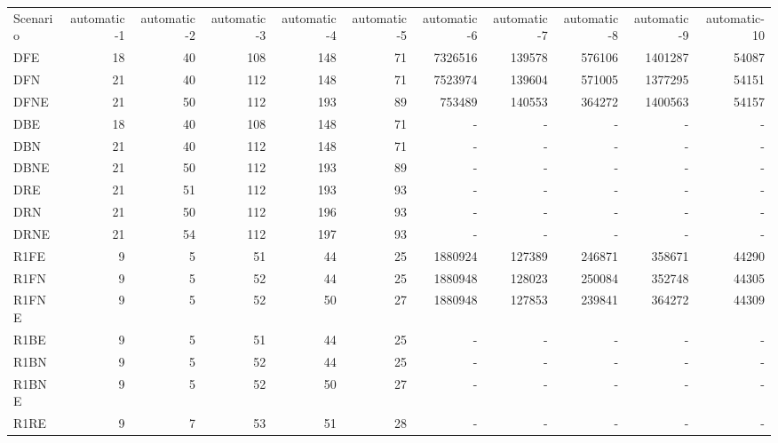 \documentclass [11pt]{article}
\begin{document}
\begin{sidewaystable}
\small
  \everyrow{\hline}
  \begin{tabu} {| l |r | r |r |r |r |r |r |r |r |r |}
  Scenario    &automatic-1   & automatic-2    &automatic-3    &automatic-4    & automatic-5  & automatic-6    & automatic-7    &  automatic-8   & automatic-9   & automatic-10 \\
  DFE    & 18   & 40    & 108    & 148   &  71   &  7326516   & 139578    & 576106    &  1401287   & 54087    \\ 
  DFN    & 21   & 40    & 112    & 148   &  71   &  7523974   & 139604    & 571005    &  1377295   & 54151   \\ 
  DFNE   & 21   & 50    & 112    & 193   &  89   &   753489   & 140553    & 364272    &  1400563   & 54157    \\ 
  DBE    & 18   & 40    & 108    & 148   &  71   &  -   &   -    &   -    &    -   &   -   \\ 
  DBN    & 21   & 40    & 112    & 148   &  71   &  -   &   -    &   -    &    -   &   -   \\ 
  DBNE    & 21  & 50    & 112    & 193   &  89   &  -   &   -    &   -    &    -   &   -    \\ 
  DRE    & 21   & 51    & 112    & 193   &  93   &  -   &   -    &   -    &    -   &   -   \\ 
  DRN    & 21   & 50    & 112    & 196   &  93   &  -   &   -    &   -    &    -   &   -   \\ 
  DRNE   & 21   & 54    & 112    & 197   &  93   &  -   &   -    &   -    &    -   &   -    \\ 
  R1FE   & 9   & 5   & 51   & 44 &  25  &   1880924  & 127389   & 246871   &  358671  & 44290 \\ 
  R1FN    & 9  & 5   & 52   & 44 &  25  &   1880948  & 128023   & 250084   &  352748  & 44305   \\ 
  R1FNE    &9   &5    &52    &50  & 27   & 1880948   &127853    &239841    & 364272   &44309    \\ 
  R1BE    & 9  & 5   & 51   & 44 &  25  &  -   &   -    &   -    &    -   &   -    \\ 
  R1BN    & 9  & 5   & 52   & 44 &  25  &  -   &   -    &   -    &    -   &   -    \\ 
  R1BNE    &9   &5    &52    &50  & 27   &  -   &   -    &   -    &    -   &   -    \\ 
  R1RE    & 9  & 7   & 53   & 51 &  28  &  -   &   -    &   -    &    -   &   -    \\ 

\end{tabu}
\end{sidewaystable}
\end{document}

